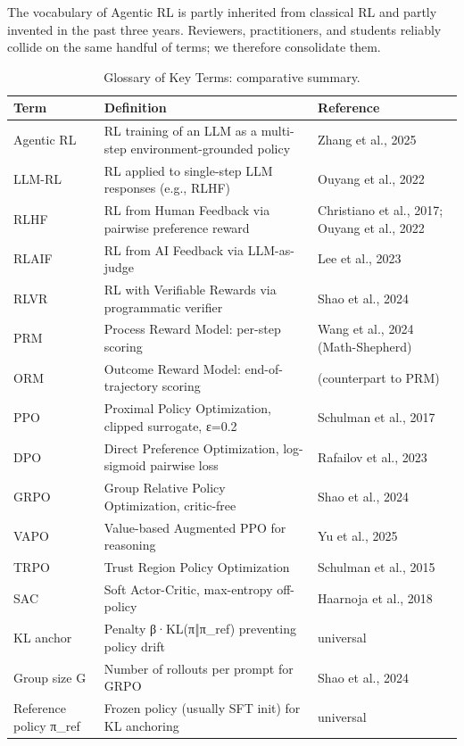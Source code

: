 \documentclass{article}
\begin{document}
The vocabulary of Agentic RL is partly inherited from classical RL and partly invented in the past three years. Reviewers, practitioners, and students reliably collide on the same handful of terms; we therefore consolidate them.

\begin{table}[t]
\centering
\caption{Glossary of Key Terms: comparative summary.}
\label{tab:glossary-of-key-terms}
\begin{tabular}{>{\raggedright\arraybackslash}p{0.2044\linewidth}
  >{\raggedright\arraybackslash}p{0.4745\linewidth}
  >{\raggedright\arraybackslash}p{0.3212\linewidth}}
\toprule
Term & Definition & Reference \\
\midrule
Agentic RL & RL training of an LLM as a multi-step environment-grounded policy & Zhang et al., 2025 \\
LLM-RL & RL applied to single-step LLM responses (e.g., RLHF) & Ouyang et al., 2022 \\
RLHF & RL from Human Feedback via pairwise preference reward & Christiano et al., 2017; Ouyang et al., 2022 \\
RLAIF & RL from AI Feedback via LLM-as-judge & Lee et al., 2023 \\
RLVR & RL with Verifiable Rewards via programmatic verifier & Shao et al., 2024 \\
PRM & Process Reward Model: per-step scoring & Wang et al., 2024 (Math-Shepherd) \\
ORM & Outcome Reward Model: end-of-trajectory scoring & (counterpart to PRM) \\
PPO & Proximal Policy Optimization, clipped surrogate, ε=0.2 & Schulman et al., 2017 \\
DPO & Direct Preference Optimization, log-sigmoid pairwise loss & Rafailov et al., 2023 \\
GRPO & Group Relative Policy Optimization, critic-free & Shao et al., 2024 \\
VAPO & Value-based Augmented PPO for reasoning & Yu et al., 2025 \\
TRPO & Trust Region Policy Optimization & Schulman et al., 2015 \\
SAC & Soft Actor-Critic, max-entropy off-policy & Haarnoja et al., 2018 \\
KL anchor & Penalty β·KL(π‖π\_ref) preventing policy drift & universal \\
Group size G & Number of rollouts per prompt for GRPO & Shao et al., 2024 \\
Reference policy π\_ref & Frozen policy (usually SFT init) for KL anchoring & universal \\

\end{tabular}
\end{table}
\end{document}
